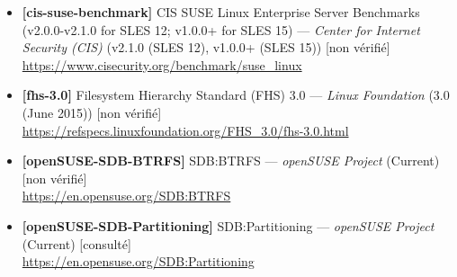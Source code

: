 \documentclass[10pt,a4paper]{article}
\begin{document}
\begin{itemize}[leftmargin=1.6em]
\item \textbf{[cis-suse-benchmark]} CIS SUSE Linux Enterprise Server Benchmarks (v2.0.0-v2.1.0 for SLES 12; v1.0.0+ for SLES 15) --- \textit{Center for Internet Security (CIS)} (v2.1.0 (SLES 12), v1.0.0+ (SLES 15)) \textcolor{cMed}{[non v\'erifi\'e]}\\ \url{https://www.cisecurity.org/benchmark/suse_linux}
\item \textbf{[fhs-3.0]} Filesystem Hierarchy Standard (FHS) 3.0 --- \textit{Linux Foundation} (3.0 (June 2015)) \textcolor{cMed}{[non v\'erifi\'e]}\\ \url{https://refspecs.linuxfoundation.org/FHS_3.0/fhs-3.0.html}
\item \textbf{[openSUSE-SDB-BTRFS]} SDB:BTRFS --- \textit{openSUSE Project} (Current) \textcolor{cMed}{[non v\'erifi\'e]}\\ \url{https://en.opensuse.org/SDB:BTRFS}
\item \textbf{[openSUSE-SDB-Partitioning]} SDB:Partitioning --- \textit{openSUSE Project} (Current) \textcolor{cOk}{[consult\'e]}\\ \url{https://en.opensuse.org/SDB:Partitioning}
\end{itemize}
\end{document}
